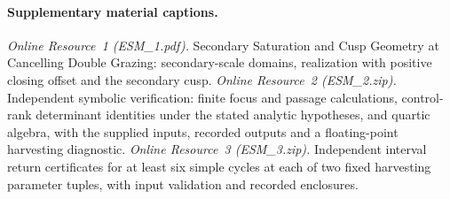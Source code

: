 \paragraph{Supplementary material captions.}
\emph{Online Resource~1 (ESM\_1.pdf).} Secondary Saturation and Cusp Geometry
at Cancelling Double Grazing: secondary-scale domains, realization with
positive closing offset and the secondary cusp.
\emph{Online Resource~2 (ESM\_2.zip).} Independent symbolic verification:
finite focus and passage calculations, control-rank determinant identities
under the stated analytic hypotheses, and quartic algebra, with the supplied
inputs, recorded outputs and a floating-point harvesting diagnostic.
\emph{Online Resource~3 (ESM\_3.zip).} Independent interval return
certificates for at least six simple cycles at each of two fixed
harvesting parameter tuples, with input validation and recorded enclosures.
